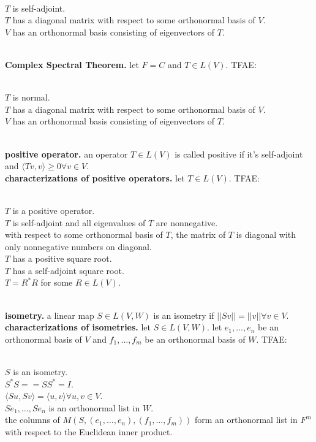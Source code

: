 	\begin{enumerate}
		\\ $T$ is self-adjoint. 
		\\ $T$ has a diagonal matrix with respect to some orthonormal basis of $V$. 
		\\ $V$ has an orthonormal basis consisting of eigenvectors of $T$. 
	\end{enumerate}
	\\ \textbf{Complex Spectral Theorem. } let $F=C$ and $T \in L(V)$. TFAE: 
	\begin{enumerate}
		\\ $T$ is normal. 
		\\ $T$ has a diagonal matrix with respect to some orthonormal basis of $V$. 
		\\ $V$ has an orthonormal basis consisting of eigenvectors of $T$. 
	\end{enumerate}
	\\ \textbf{positive operator. } an operator $T \in L(V)$ is called positive if it's self-adjoint and $\langle Tv,v \rangle \geq 0 \forall v \in V$. 
	\\ \textbf{characterizations of positive operators. } let $T \in L(V)$. TFAE: 
	\begin{enumerate}
		\\ $T$ is a positive operator. 
		\\ $T$ is self-adjoint and all eigenvalues of $T$ are nonnegative. 
		\\ with respect to some orthonormal basis of $T$, the matrix of $T$ is diagonal with only nonnegative numbers on diagonal. 
		\\ $T$ has a positive square root. 
		\\ $T$ has a self-adjoint square root. 
		\\ $T=R^*R$ for some $R \in L(V)$. 
	\end{enumerate}
	\\ \textbf{isometry. } a linear map $S \in L(V,W)$ is an isometry if $||Sv|| = ||v|| \forall v \in V$. 
	\\ \textbf{characterizations of isometries. } let $S \in L(V,W)$. let $e_1,\dots,e_n$ be an orthonormal basis of $V$ and $f_1,\dots,f_m$ be an orthonormal basis of $W$. TFAE: 
	\begin{enumerate}
		\\ $S$ is an isometry. 
		\\ $S^*S = = SS^* = I$. 
		\\ $\langle Su,Sv \rangle = \langle u,v \rangle \forall u,v \in V$. 
		\\ $Se_1,\dots,Se_n$ is an orthonormal list in $W$. 
		\\ the columns of $M(S,(e_1,\dots,e_n), (f_1,\dots,f_m))$ form an orthonormal list in $F^m$ with respect to the Euclidean inner product. 
	\end{enumerate}

